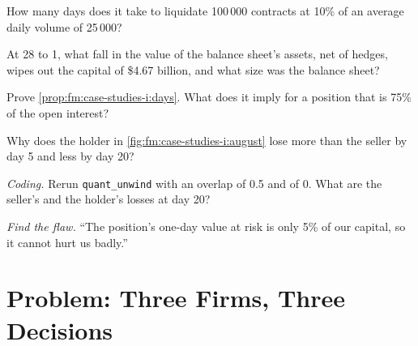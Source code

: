 \begin{exercise}[$\star$]\label{exo:fm:case-studies-i:3}
How many days does it take to liquidate 100\,000 contracts at 10\% of an average daily volume of 25\,000?
\end{exercise}

\begin{exercise}[$\star\star$]\label{exo:fm:case-studies-i:4}
At 28 to 1, what fall in the value of the balance sheet's assets, net of hedges, wipes out the capital of \$4.67 billion, and what size was the
balance sheet?
\end{exercise}

\begin{exercise}[$\star\star$]\label{exo:fm:case-studies-i:5}
Prove \cref{prop:fm:case-studies-i:days}. What does it imply for a position that is 75\% of the open interest?
\end{exercise}

\begin{exercise}[$\star\star$]\label{exo:fm:case-studies-i:6}
Why does the holder in \cref{fig:fm:case-studies-i:august} lose more than the seller by day 5 and less by day 20?
\end{exercise}

\begin{exercise}[$\star\star\star$]\label{exo:fm:case-studies-i:7}
\emph{Coding.} Rerun \texttt{quant\_unwind} with an overlap of 0.5 and of 0. What are the seller's and the holder's losses at day 20?
\end{exercise}

\begin{exercise}[$\star\star\star$]\label{exo:fm:case-studies-i:8}
\emph{Find the flaw.} ``The position's one-day value at risk is only 5\% of our capital, so it cannot hurt us badly.''
\end{exercise}

\section{Problem: Three Firms, Three Decisions}

